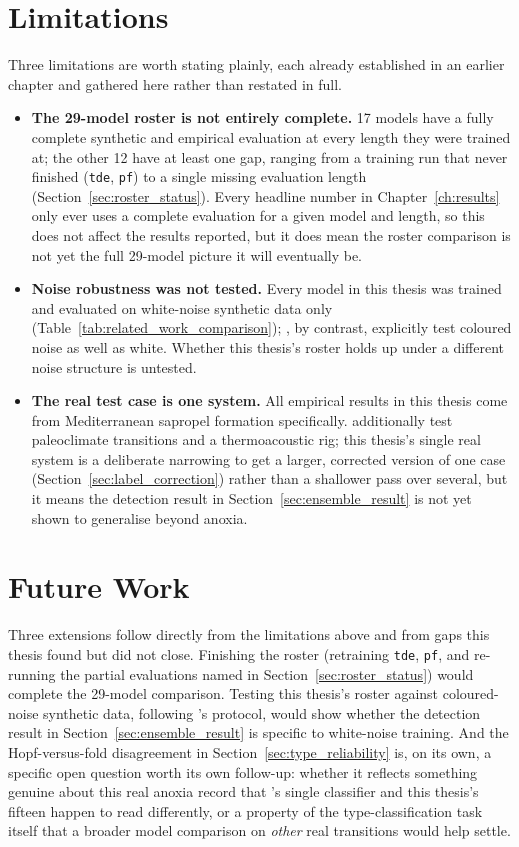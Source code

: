 \section{Limitations}
Three limitations are worth stating plainly, each already established in an earlier chapter and gathered here rather than restated in full.

\begin{itemize}
    \item \textbf{The 29-model roster is not entirely complete.} 17 models have a fully complete synthetic and empirical evaluation at every length they were trained at; the other 12 have at least one gap, ranging from a training run that never finished (\texttt{tde}, \texttt{pf}) to a single missing evaluation length (Section~\ref{sec:roster_status}). Every headline number in Chapter~\ref{ch:results} only ever uses a complete evaluation for a given model and length, so this does not affect the results reported, but it does mean the roster comparison is not yet the full 29-model picture it will eventually be.
    \item \textbf{Noise robustness was not tested.} Every model in this thesis was trained and evaluated on white-noise synthetic data only (Table~\ref{tab:related_work_comparison}); \citet{babazadeh2025}, by contrast, explicitly test coloured noise as well as white. Whether this thesis's roster holds up under a different noise structure is untested.
    \item \textbf{The real test case is one system.} All empirical results in this thesis come from Mediterranean sapropel formation specifically. \citet{bury2021} additionally test paleoclimate transitions and a thermoacoustic rig; this thesis's single real system is a deliberate narrowing to get a larger, corrected version of one case (Section~\ref{sec:label_correction}) rather than a shallower pass over several, but it means the detection result in Section~\ref{sec:ensemble_result} is not yet shown to generalise beyond anoxia.
\end{itemize}

\section{Future Work}
Three extensions follow directly from the limitations above and from gaps this thesis found but did not close. Finishing the roster (retraining \texttt{tde}, \texttt{pf}, and re-running the partial evaluations named in Section~\ref{sec:roster_status}) would complete the 29-model comparison. Testing this thesis's roster against coloured-noise synthetic data, following \citet{babazadeh2025}'s protocol, would show whether the detection result in Section~\ref{sec:ensemble_result} is specific to white-noise training. And the Hopf-versus-fold disagreement in Section~\ref{sec:type_reliability} is, on its own, a specific open question worth its own follow-up: whether it reflects something genuine about this real anoxia record that \citet{bury2021}'s single classifier and this thesis's fifteen happen to read differently, or a property of the type-classification task itself that a broader model comparison on \emph{other} real transitions would help settle.
